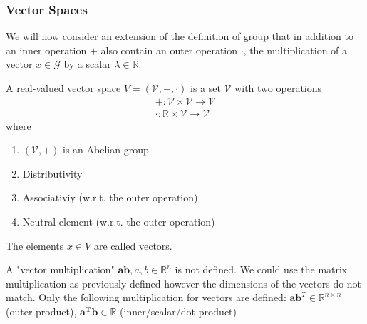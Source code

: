 \subsubsection*{Vector Spaces}
We will now consider an extension of the definition of group that in addition to an inner operation $+$ also contain an outer operation $\cdot$, the multiplication of a vector $x\in \mathcal{G}$ by a scalar $\lambda \in \mathbb{R}$.
\begin{definition}
    A real-valued vector space $V = (\mathcal{V}, +, \cdot)$ is a set $\mathcal{V}$ with two operations
    \begin{align*}
        + : \mathcal{V} \times \mathcal{V} \rightarrow \mathcal{V}\\
        \cdot : \mathbb{R}  \times \mathcal{V} \rightarrow \mathcal{V}
    \end{align*}
    where
    \begin{enumerate}
        \item $(\mathcal{V},+)$ is an Abelian group
        \item Distributivity
        \item Associativiy (w.r.t. the outer operation)
        \item Neutral element (w.r.t. the outer operation)
    \end{enumerate}
\end{definition}
The elements $x \in V$ are called vectors.
\begin{remark}
    A "vector multiplication" $\mathbf{ab}, a,b \in \mathbb{R}^n$ is not defined. We could use the matrix multiplication as previously defined however the dimensions of the vectors do not match. Only the following multiplication for vectors are defined: $\mathbf{ab}^T \in \mathbb{R}^{n\times n}$ (outer product), $\mathbf{a^Tb}\in \mathbb{R}$ (inner/scalar/dot product)
\end{remark}

